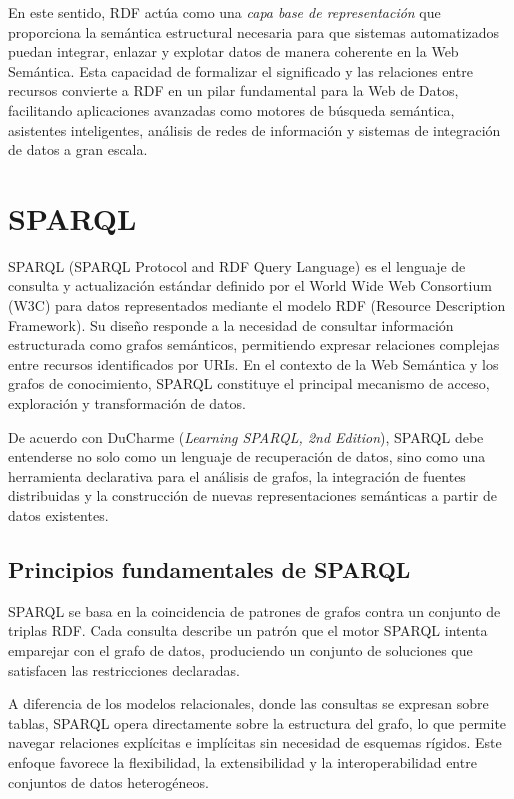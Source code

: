 \documentclass{article}
\begin{document}
En este sentido, RDF actúa como una \textit{capa base de representación} que proporciona la semántica estructural necesaria para que sistemas automatizados puedan integrar, enlazar y explotar datos de manera coherente en la Web Semántica. Esta capacidad de formalizar el significado y las relaciones entre recursos convierte a RDF en un pilar fundamental para la Web de Datos, facilitando aplicaciones avanzadas como motores de búsqueda semántica, asistentes inteligentes, análisis de redes de información y sistemas de integración de datos a gran escala.


\section{SPARQL}

SPARQL (SPARQL Protocol and RDF Query Language) es el lenguaje de consulta y actualización estándar definido por el World Wide Web Consortium (W3C) para datos representados mediante el modelo RDF (Resource Description Framework). Su diseño responde a la necesidad de consultar información estructurada como grafos semánticos, permitiendo expresar relaciones complejas entre recursos identificados por URIs. En el contexto de la Web Semántica y los grafos de conocimiento, SPARQL constituye el principal mecanismo de acceso, exploración y transformación de datos.

De acuerdo con DuCharme (\textit{Learning SPARQL, 2nd Edition}), SPARQL debe entenderse no solo como un lenguaje de recuperación de datos, sino como una herramienta declarativa para el análisis de grafos, la integración de fuentes distribuidas y la construcción de nuevas representaciones semánticas a partir de datos existentes.

\subsection{Principios fundamentales de SPARQL}

SPARQL se basa en la coincidencia de patrones de grafos contra un conjunto de triplas RDF. Cada consulta describe un patrón que el motor SPARQL intenta emparejar con el grafo de datos, produciendo un conjunto de soluciones que satisfacen las restricciones declaradas.

A diferencia de los modelos relacionales, donde las consultas se expresan sobre tablas, SPARQL opera directamente sobre la estructura del grafo, lo que permite navegar relaciones explícitas e implícitas sin necesidad de esquemas rígidos. Este enfoque favorece la flexibilidad, la extensibilidad y la interoperabilidad entre conjuntos de datos heterogéneos.
\end{document}
